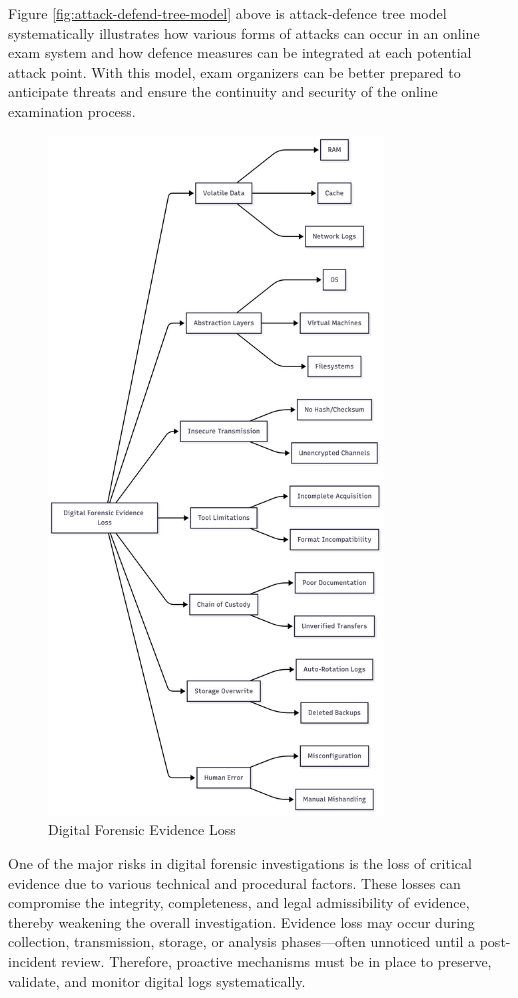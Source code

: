 Figure \ref{fig:attack-defend-tree-model} above \citet{rosmansyah2019attackdefensetreeonaeexamsystem} is attack-defence tree model systematically illustrates how various forms of attacks can occur in an online exam system and how defence measures can be integrated at each potential attack point. With this model, exam organizers can be better prepared to anticipate threats and ensure the continuity and security of the online examination process.
\begin{figure}[H] 
	\centering
	\includegraphics[height=18cm]{figure/df-evidence-loss.png}
	\caption{Digital Forensic Evidence Loss \cite{larchenko2025mindmap}}
	\label{fig:df-evidence-loss}
\end{figure}

One of the major risks in digital forensic investigations is the loss of critical evidence due to various technical and procedural factors. These losses can compromise the integrity, completeness, and legal admissibility of evidence, thereby weakening the overall investigation. Evidence loss may occur during collection, transmission, storage, or analysis phases—often unnoticed until a post-incident review. Therefore, proactive mechanisms must be in place to preserve, validate, and monitor digital logs systematically.

